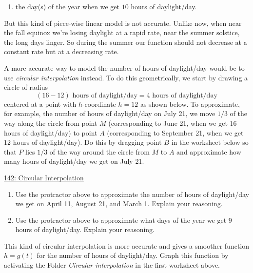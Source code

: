 \documentclass{ximera}
\begin{document}
\begin{example}
\begin{question}
\begin{enumerate}
\item the day(s) of the year when we get $10$ hours of daylight/day.
\end{enumerate}

But this kind of piece-wise linear model is not accurate. Unlike now, when near the fall equinox  we're losing daylight at a rapid rate, near the summer solstice, the long days linger. So during the summer our function should not decrease at a constant rate but at a decreasing rate.

A more accurate way to model the number of hours of daylight/day would be to use \emph{circular interpolation} instead. To do this geometrically, we start by drawing a circle of radius 
\[
     (16 - 12) \text{ hours of daylight/day} = 4 \text{ hours of daylight/day}
\]
centered at a point with $h$-coordinate $h=12$ as shown below. To approximate, for example, the number of hours of daylight/day on July 21, we move $1/3$ of the way along the circle from point $M$ (corresponding to June 21, when we get $16$ hours of daylight/day) to point $A$ (corresponding to September 21, when we get $12$ hours of daylight/day). Do this by dragging point $B$ in the worksheet below so that $P$ lies $1/3$ of the way around the circle from $M$ to $A$ and approximate how many hours of daylight/day we get on July 21.

 
\begin{onlineOnly}
    \begin{center}
\end{center}
\end{onlineOnly}

\href{https://www.desmos.com/calculator/dhzo6hhjw1}{142: Circular Interpolation}

\begin{enumerate}
\item Use the protractor above to approximate the number of hours of daylight/day we get on April 11, August 21, and March 1. Explain your reasoning.
\begin{freeResponse} 
\end{freeResponse}

\item Use the protractor above to approximate what days of the year we get $9$ hours of daylight/day. Explain your reasoning.
\begin{freeResponse}
\end{freeResponse}
\end{enumerate}

This kind of circular interpolation is more accurate and gives a smoother function $h=g(t)$ for the number of hours of daylight/day. Graph this function by activating the Folder \emph{Circular interpolation} in the first worksheet above.

\end{question}
\end{example}
\end{document}

